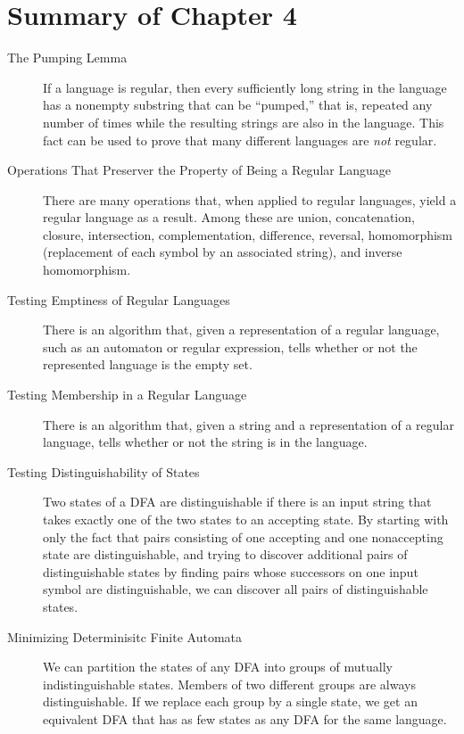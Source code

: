 \documentclass[]{article}
\begin{document}
\section*{Summary of Chapter 4}
  \begin{description}
    \item[The Pumping Lemma] If a language is regular, then every sufficiently
    long string in the language has a nonempty substring that can be ``pumped,''
    that is, repeated any number of times while the resulting strings are also
    in the language. This fact can be used to prove that many different
    languages are \emph{not} regular.
    \item[Operations That Preserver the Property of Being a Regular Language]
    There are many operations that, when applied to regular languages, yield a
    regular language as a result. Among these are union, concatenation, closure,
    intersection, complementation, difference, reversal, homomorphism
    (replacement of each symbol by an associated string), and inverse
    homomorphism.
    \item[Testing Emptiness of Regular Languages] There is an algorithm that,
    given a representation of a regular language, such as an automaton or
    regular expression, tells whether or not the represented language is the
    empty set.
    \item[Testing Membership in a Regular Language] There is an algorithm that,
    given a string and a representation of a regular language, tells whether or
    not the string is in the language.
    \item[Testing Distinguishability of States] Two states of a DFA are
    distinguishable if there is an input string that takes exactly one of the
    two states to an accepting state. By starting with only the fact that pairs
    consisting of one accepting and one nonaccepting state are distinguishable,
    and trying to discover additional pairs of distinguishable states by finding
    pairs whose successors on one input symbol are distinguishable, we can
    discover all pairs of distinguishable states.
    \item[Minimizing Determinisitc Finite Automata] We can partition the states
    of any DFA into groups of mutually indistinguishable states. Members of two
    different groups are always distinguishable. If we replace each group by a
    single state, we get an equivalent DFA that has as few states as any DFA for
    the same language.
  \end{description}
\end{document}
